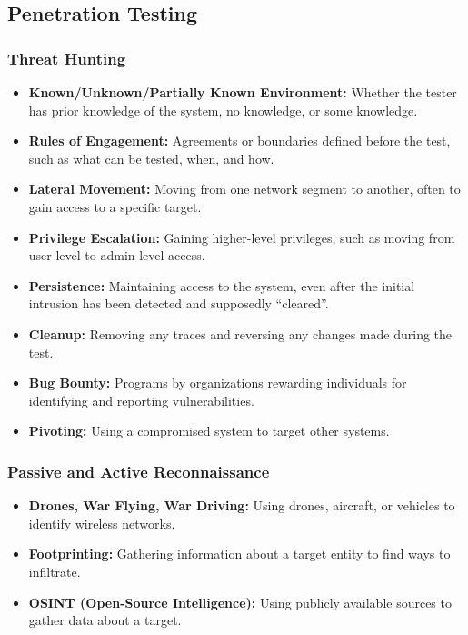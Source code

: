 \begin{fullwidth} 
    \subsection{Penetration Testing}
    \subsubsection*{\color{red}Threat Hunting}
    \begin{itemize}
        \item \textbf{Known/Unknown/Partially Known Environment:} Whether the tester has prior knowledge of the system, no knowledge, or some knowledge.
        \item \textbf{Rules of Engagement:} Agreements or boundaries defined before the test, such as what can be tested, when, and how.
        \item \textbf{Lateral Movement:} Moving from one network segment to another, often to gain access to a specific target.
        \item \textbf{Privilege Escalation:} Gaining higher-level privileges, such as moving from user-level to admin-level access.
        \item \textbf{Persistence:} Maintaining access to the system, even after the initial intrusion has been detected and supposedly “cleared”.
        \item \textbf{Cleanup:} Removing any traces and reversing any changes made during the test.
        \item \textbf{Bug Bounty:} Programs by organizations rewarding individuals for identifying and reporting vulnerabilities.
        \item \textbf{Pivoting:} Using a compromised system to target other systems.
    \end{itemize}
    \subsubsection*{\color{red}Passive and Active Reconnaissance}
    \begin{itemize}
        \item \textbf{Drones, War Flying, War Driving:} Using drones, aircraft, or vehicles to identify wireless networks.
        \item \textbf{Footprinting:} Gathering information about a target entity to find ways to infiltrate.
        \item \textbf{OSINT (Open-Source Intelligence):} Using publicly available sources to gather data about a target.
    \end{itemize}


\end{fullwidth}
